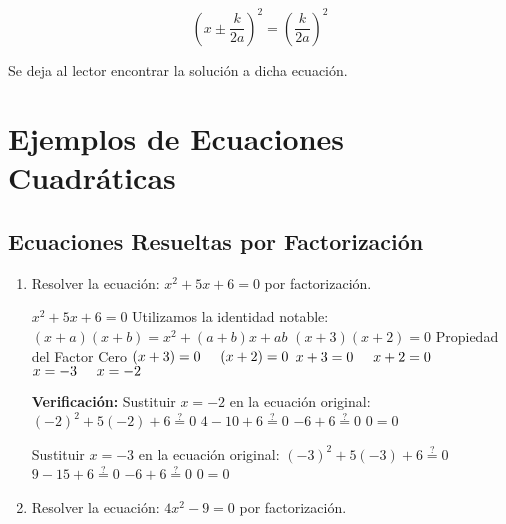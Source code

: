 \documentclass[A4paper, 10pt, oneside]{book}
\begin{document}
	$$\left(x \pm \frac{k}{2a}\right)^2=\left(\frac{k}{2a}\right)^2$$\newline
	
	Se deja al lector encontrar la solución a dicha ecuación.
	
	\section{Ejemplos de Ecuaciones Cuadráticas}
	
	\subsection{Ecuaciones Resueltas por Factorización}
	\begin{enumerate}
		\item Resolver la ecuación: $x^2+5x+6=0$ por factorización.
		
		\begin{tcolorbox}[title=Solución, colback=white]
			$x^2+5x+6=0$\newline
			Utilizamos la identidad notable: $(x+a)(x+b)=x^2+(a+b)x+ab$\newline
			$(x+3)(x+2)=0$\newline
			Propiedad del Factor Cero\newline
			$(x+3)=0 \hspace{5mm} (x+2)=0$\newline
			$x+3=0 \hspace{5mm} x+2=0$\newline
			$x=-3 \hspace{5mm} x=-2$
			
			\vspace{10mm}
			\textbf{Verificación:}\newline
			Sustituir $x=-2$ en la ecuación original:\newline
			$(-2)^2+5(-2)+6 \overset{?}{=}0$\newline
			$4-10+6 \overset{?}{=} 0$\newline
			$-6+6\overset{?}{=}0$\newline
			$0=0$\newline
			
			Sustituir $x=-3$ en la ecuación original:\newline
			$(-3)^2+5(-3)+6 \overset{?}{=}0$\newline
			$9-15+6 \overset{?}{=} 0$\newline
			$-6+6\overset{?}{=}0$\newline
			$0=0$
		\end{tcolorbox}
		\item Resolver la ecuación: $4x^2-9=0$ por factorización. 
		

\end{enumerate}
\end{document}
